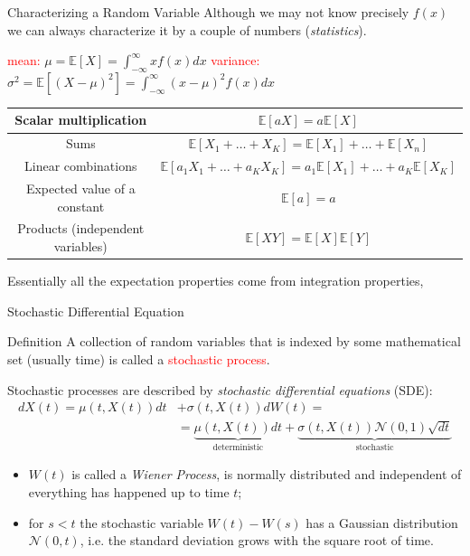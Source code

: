 \documentclass{beamer}
\begin{document}
\begin{frame}{Characterizing a Random Variable}
Although we may not know precisely $f(x)$ we can always characterize it by a couple of numbers (\emph{statistics}).
	\small{
		\begin{center}
			\textcolor{red}{mean:} $\boxed{\mu = \mathbb{E}[X] = \int_{-\infty}^{\infty} xf(x)dx}$\quad
			\textcolor{red}{variance:}  
			$\boxed{\sigma^2 = \mathbb{E}[(X-\mu)^2] =\int_{-\infty}^{\infty} (x-\mu)^2f(x)dx}$
	\end{center}
}
	\renewcommand{\arraystretch}{1.4}
{\tiny {\tiny }}{
	\begin{table}[bt]
		\begin{tabular}{|c|c|} \hline
			Scalar multiplication & $\mathbb{E}[aX] = a\mathbb{E}[X]$ \\ \hline
			Sums & $\mathbb{E}[X_1+\ldots +X_K] =  \mathbb{E}[X_1] +\ldots + \mathbb{E}[X_n]$ \\ \hline
			Linear combinations & $\mathbb{E}[a_1X_1+\ldots +a_KX_K] =  a_1\mathbb{E}[X_1] +\ldots + a_K\mathbb{E}[X_K]$ \\ \hline
			Expected value of a constant & $\mathbb{E}[a] = a$ \\ \hline
			Products (independent variables) & $\mathbb{E}[XY] = \mathbb{E}[X] \mathbb{E}[Y]$ \\ \hline
		\end{tabular}
	\end{table}
}
Essentially all the expectation properties come from integration properties,
\end{frame}

\begin{frame}{Stochastic Differential Equation}
\begin{block}{Definition}
A collection of random variables that is indexed by some mathematical set (usually time) is called a \textcolor{red}{stochastic process}.
\end{block}
Stochastic processes are described by \emph{stochastic differential equations} (SDE):	
	\begin{equation}
		\begin{aligned}
			dX(t) = \mu(t,X(t)) dt &+ \sigma(t,X(t)) dW(t) =\\  & =\underbrace{\mu(t,X(t))dt}_{\textrm{deterministic}} + \underbrace{\sigma(t,X(t)) \mathcal{N}(0,1)\sqrt{dt}}_{\textrm{stochastic}}
		\end{aligned}
	\label{eq:sde}
	\end{equation}
	
\begin{itemize}
\item $W(t)$ is called a \emph{Wiener Process}, is normally distributed and independent of everything has happened up to time $t$;
\item for $s< t$ the stochastic variable $W(t)-W(s)$ has a Gaussian distribution $\mathcal{N}(0, t)$, i.e. the standard deviation grows with the square root of time.
\end{itemize}  
\end{frame}
\end{document}
